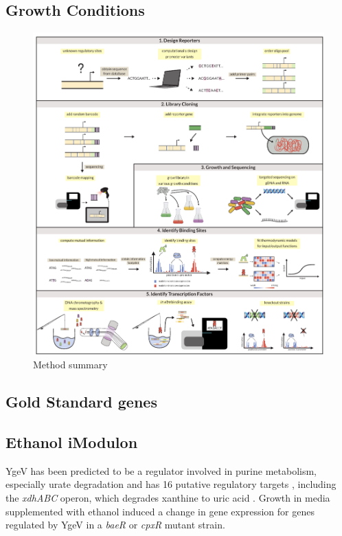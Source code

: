 \subsection{Growth Conditions}
\begin{figure}
    \centering
    \includegraphics{../figures/figure2_method_sum.pdf}
    \caption{Method summary}
    \label{fig:method_sum}
\end{figure}
\subsection{Gold Standard genes}
\subsection{Ethanol iModulon}
YgeV has been predicted to be a regulator involved in purine metabolism, especially urate degradation \cite{iwadate2019identification} and has 16 putative regulatory targets \cite{lamoureux2021precise}, including the \textit{xdhABC} operon, which degrades xanthine to uric acid \cite{iwadate2019identification}. Growth in media supplemented with ethanol induced a change in gene expression for genes regulated by YgeV in a \textDelta\textit{baeR} or \textDelta\textit{cpxR} mutant strain.
